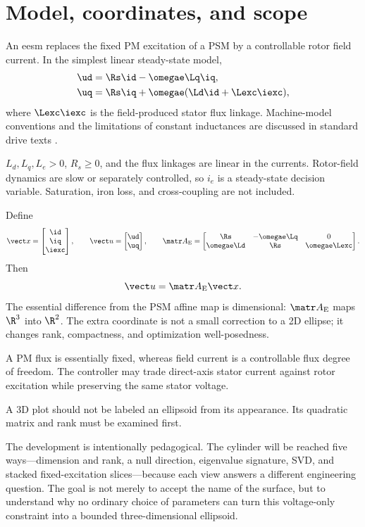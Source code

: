 \section{Model, coordinates, and scope}

An \gls{eesm} replaces the fixed PM excitation of a PSM by a controllable rotor
field current.  In the simplest linear steady-state model,
\begin{align}
 \ud&=\Rs\id-\omegae\Lq\iq,\label{eq:eesm-ud}\\
 \uq&=\Rs\iq+\omegae(\Ld\id+\Lexc\iexc),\label{eq:eesm-uq}
\end{align}
where $\Lexc\iexc$ is the field-produced stator flux linkage.  Machine-model
conventions and the limitations of constant inductances are discussed in
standard drive texts \cite{binder2017,schroeder2021}.

\begin{assumption}
$L_d,L_q,L_e>0$, $R_s\geq0$, and the flux linkages are linear in the currents.
Rotor-field dynamics are slow or separately controlled, so $i_e$ is a
steady-state decision variable.  Saturation, iron loss, and cross-coupling are
not included.
\end{assumption}

Define
\begin{equation}
 \state=\begin{bmatrix}\id\\\iq\\\iexc\end{bmatrix},\qquad
 \vect u=\begin{bmatrix}\ud\\\uq\end{bmatrix},\qquad
 \Ae=\begin{bmatrix}
 \Rs&-\omegae\Lq&0\\
 \omegae\Ld&\Rs&\omegae\Lexc
 \end{bmatrix}.
\end{equation}
Then
\begin{equation}
 \vect u=\Ae\state.\label{eq:eesm-map}
\end{equation}
The essential difference from the PSM affine map is dimensional: $\Ae$ maps
$\R^3$ into $\R^2$.  The extra coordinate is not a small correction to a 2D
ellipse; it changes rank, compactness, and optimization well-posedness.

\physinterpretation A PM flux is essentially fixed, whereas field current is a
controllable flux degree of freedom.  The controller may trade direct-axis
stator current against rotor excitation while preserving the same stator
voltage.

\engineeringconsequence A 3D plot should not be labeled an ellipsoid from its
appearance.  Its quadratic matrix and rank must be examined first.

The development is intentionally pedagogical.  The cylinder will be reached
five ways---dimension and rank, a null direction, eigenvalue signature, SVD,
and stacked fixed-excitation slices---because each view answers a different
engineering question.  The goal is not merely to accept the name of the
surface, but to understand why no ordinary choice of parameters can turn this
voltage-only constraint into a bounded three-dimensional ellipsoid.

